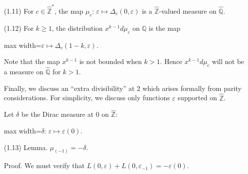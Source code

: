 \documentclass[11pt]{article}
\newcommand{\DFormula}[1]{\par\smallskip\noindent\begin{adjustbox}{max width=\linewidth}$\displaystyle #1$\end{adjustbox}\par\smallskip}
\begin{document}
(1.11) For \(c\in \widehat{\mathbb{Z}}^{\ast}\), the map \(\mu _{c}\): \(\varepsilon \mapsto \Delta _{c}(0,\varepsilon )\) is a \(\widehat{\mathbb{Z}}\)-valued measure on \(\widehat{\mathbb{Q}}\).\par
\par
(1.12) For \(k\geq 1\), the distribution \(x^{k-1}d\mu _{c}\) on \(\widehat{\mathbb{Q}}\) is the map\par
\par
\DFormula{\varepsilon \mapsto \Delta _{c}(1-k,\varepsilon ).}
\par
Note that the map \(x^{k-1}\) is not bounded when \(k>1\). Hence \(x^{k-1}d\mu _{c}\) will not be a measure on \(\widehat{\mathbb{Q}}\) for \(k>1\).\par
\par
Finally, we discuss an “extra divisibility” at 2 which arises formally from parity considerations. For simplicity, we discuss only functions \(\varepsilon \) supported on \(\widehat{\mathbb{Z}}\).\par
\par
Let \(\delta \) be the Dirac measure at 0 on \(\widehat{\mathbb{Z}}\):\par
\par
\DFormula{\delta :\,\varepsilon \mapsto \varepsilon (0).}
\par
(1.13) Lemma. \(\mu _{(-1)}=-\delta \).\par
\par
Proof. We must verify that \(L(0,\varepsilon )+L(0,\varepsilon _{-1})=-\varepsilon (0)\).\par
\par
\end{document}
